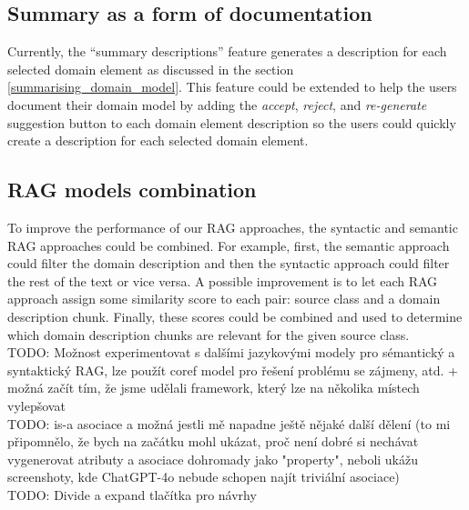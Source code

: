 \subsection{Summary as a form of documentation}

Currently, the ``summary descriptions'' feature generates a description for each selected domain element as discussed in the section \ref{summarising_domain_model}. This feature could be extended to help the users document their domain model by adding the \textit{accept}, \textit{reject}, and \textit{re-generate} suggestion button to each domain element description so the users could quickly create a description for each selected domain element.


\subsection{RAG models combination}

To improve the performance of our RAG approaches, the syntactic and semantic RAG approaches could be combined. For example, first, the semantic approach could filter the domain description and then the syntactic approach could filter the rest of the text or vice versa. A possible improvement is to let each RAG approach assign some similarity score to each pair: source class and a domain description chunk. Finally, these scores could be combined and used to determine which domain description chunks are relevant for the given source class. \\

\noindent{}TODO: Možnost experimentovat s dalšími jazykovými modely pro sémantický a syntaktický RAG, lze použít coref model pro řešení problému se zájmeny, atd. + možná začít tím, že jsme udělali framework, který lze na několika místech vylepšovat \\

\noindent{}TODO: is-a asociace a možná jestli mě napadne ještě nějaké další dělení (to mi připomnělo, že bych na začátku mohl ukázat, proč není dobré si nechávat vygenerovat atributy a asociace dohromady jako "property", neboli ukážu screenshoty, kde ChatGPT-4o nebude schopen najít triviální asociace) \\

\noindent{}TODO: Divide a expand tlačítka pro návrhy